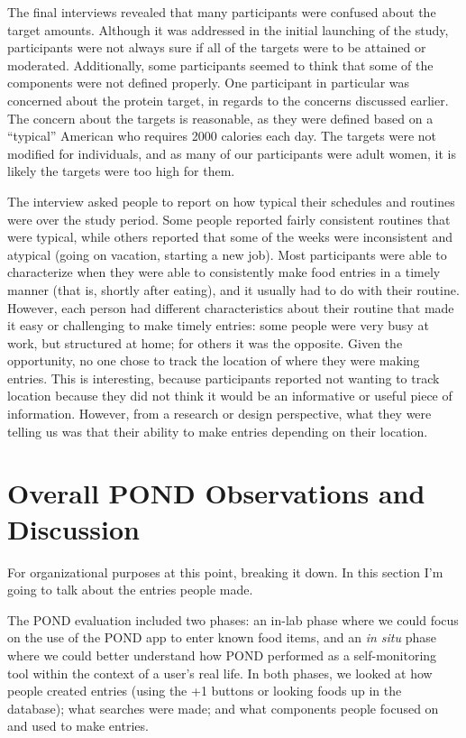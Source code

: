 The final interviews revealed that many participants were confused about the target amounts. Although it was addressed in the initial launching of the study, participants were not always sure if all of the targets were to be attained or moderated. Additionally, some participants seemed to think that some of the components were not defined properly. One participant in particular was concerned about the protein target, in regards to the concerns discussed earlier. The concern about the targets is reasonable, as they were defined based on a ``typical'' American who requires 2000 calories each day. The targets were not modified for individuals, and as many of our participants were adult women, it is likely the targets were too high for them. 

The interview asked people to report on how typical their schedules and routines were over the study period. Some people reported fairly consistent routines that were typical, while others reported that some of the weeks were inconsistent and atypical (going on vacation, starting a new job). Most participants were able to characterize when they were able to consistently make food entries in a timely manner (that is, shortly after eating), and it usually had to do with their routine. However, each person had different characteristics about their routine that made it easy or challenging to make timely entries: some people were very busy at work, but structured at home; for others it was the opposite. Given the opportunity, no one chose to track the location of where they were making entries. This is interesting, because participants reported not wanting to track location because they did not think it would be an informative or useful piece of information. However, from a research or design perspective, what they were telling us was that their ability to make entries depending on their location. 

\section{Overall POND Observations and Discussion}
For organizational purposes at this point, breaking it down. In this section I'm going to talk about the entries people made. 

The POND evaluation included two phases: an in-lab phase where we could focus on the use of the POND app to enter known food items, and an \textit{in situ} phase where we could better understand how POND performed as a self-monitoring tool within the context of a user's real life. In both phases, we looked at how people created entries (using the +1 buttons or looking foods up in the database); what searches were made; and what components people focused on and used to make entries. 


